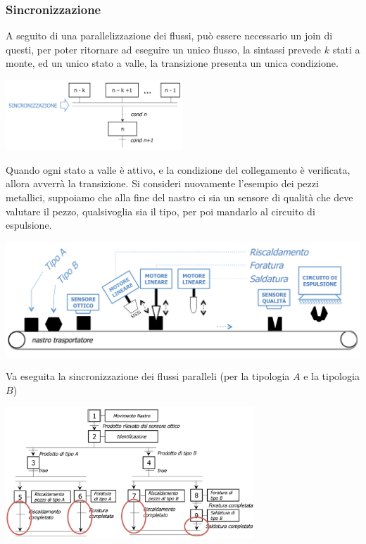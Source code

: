 \documentclass[10pt, letterpaper]{report}
\begin{document}
\subsubsection{Sincronizzazione}
A seguito di una parallelizzazione dei flussi, può essere necessario un join di questi, per poter ritornare ad eseguire un unico flusso, la sintassi prevede $k$ stati a monte, ed un unico stato a valle, la transizione presenta un unica condizione.
\begin{center}
    \includegraphics[width=0.5\textwidth ]{images/sincronizzazione.png}
\end{center}
Quando ogni stato a valle è attivo, e la condizione del collegamento è verificata, allora avverrà la transizione.\acc 
Si consideri nuovamente l'esempio dei pezzi metallici, suppoiamo che alla fine del nastro ci sia un sensore di qualità che deve valutare il pezzo, qualsivoglia sia il tipo, per poi mandarlo al circuito di espulsione.
\begin{center}
    \includegraphics[width=1\textwidth ]{images/esempioPezzi6.png}
\end{center}
Va eseguita la sincronizzazione dei flussi paralleli (per la tipologia $A$ e la tipologia $B$)
\begin{center}
    \includegraphics[width=0.7\textwidth ]{images/esempioPezzi7.png}
\end{center}
\end{document}

